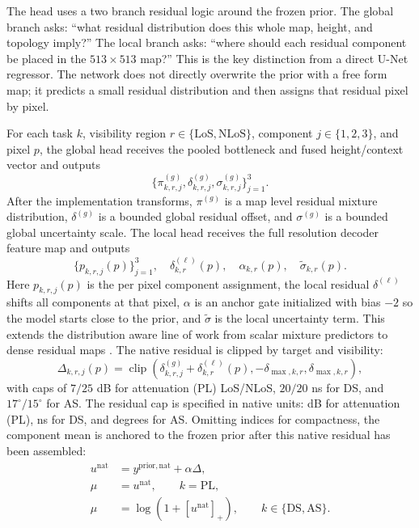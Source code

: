 \documentclass[journal]{IEEEtran}
\begin{document}
The head uses a two branch residual logic around the frozen prior. The global branch asks:
``what residual distribution does this whole map, height, and topology imply?''
The local branch asks: ``where should each residual component be placed in the
\(513\times513\) map?'' This is the key distinction from a direct U-Net
regressor. The network does not directly overwrite the prior with a free form
map; it predicts a small residual distribution and then assigns that residual
pixel by pixel.

For each task \(k\), visibility region \(r\in\{\mathrm{LoS},\mathrm{NLoS}\}\),
component \(j\in\{1,2,3\}\), and pixel \(p\), the global head receives the
pooled bottleneck and fused height/context vector and outputs
\[
  \{\pi^{(g)}_{k,r,j},\delta^{(g)}_{k,r,j},\sigma^{(g)}_{k,r,j}\}_{j=1}^{3}.
\]
After the implementation transforms, \(\pi^{(g)}\) is a map level residual
mixture distribution, \(\delta^{(g)}\) is a bounded global residual offset, and
\(\sigma^{(g)}\) is a bounded global uncertainty scale. The local head receives
the full resolution decoder feature map and outputs
\[
  \{p_{k,r,j}(p)\}_{j=1}^{3},\quad
  \delta^{(\ell)}_{k,r}(p),\quad
  \alpha_{k,r}(p),\quad
  \tilde\sigma_{k,r}(p).
\]
Here \(p_{k,r,j}(p)\) is the per pixel component assignment, the local residual
\(\delta^{(\ell)}\) shifts all components at that pixel, \(\alpha\) is an
anchor gate initialized with bias \(-2\) so the model starts close to the
prior, and \(\tilde\sigma\) is the local uncertainty term. This extends the
distribution aware line of work from scalar mixture predictors to dense
residual maps \cite{saleh2021probabilistic,garciamarti2020mixture,
lee2024timevarying}. The native residual is clipped by target and visibility:
\begin{equation}
\Delta_{k,r,j}(p)
=\operatorname{clip}\!\left(
\delta^{(g)}_{k,r,j}+\delta^{(\ell)}_{k,r}(p),
-\delta_{\max,k,r},\delta_{\max,k,r}
\right),
\label{eq:delta-paper}
\end{equation}
with caps of \(7/25\) dB for attenuation (PL) LoS/NLoS, \(20/20\) ns for DS, and
\(17^\circ/15^\circ\) for AS. The residual cap is specified in native units:
dB for attenuation (PL), ns for DS, and degrees for AS. Omitting indices for compactness,
the component mean is anchored to the frozen prior after this native residual
has been assembled:
\begin{equation}
\begin{aligned}
u^{\mathrm{nat}}&=y^{\mathrm{prior,nat}}+\alpha\Delta,\\
\mu&=u^{\mathrm{nat}},\qquad k=\mathrm{PL},\\
\mu&=\log(1+[u^{\mathrm{nat}}]_+),\qquad k\in\{\mathrm{DS},\mathrm{AS}\}.
\end{aligned}
\label{eq:mu-paper}
\end{equation}
\end{document}
